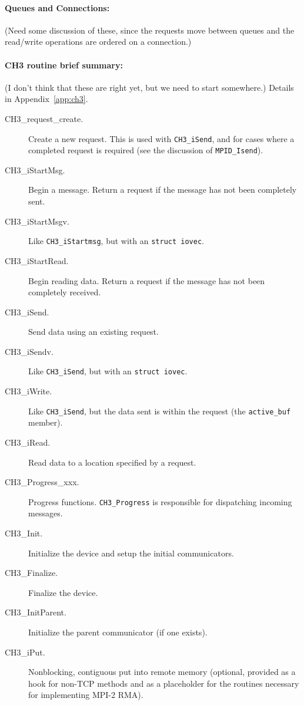 \documentclass{article}
\def\mpids#1#2{\code{#2}\index{#1!#2}}
\def\code{\begingroup\makeustext\eatcode}
\def\eatcode#1{\texttt{#1}\endgroup}
\begin{document}
\paragraph{Queues and Connections:}

(Need some discussion of these, since the requests move between queues and the 
read/write operations are ordered on a connection.)

\paragraph{CH3 routine brief summary:}

(I don't think that these are right yet, but we need to start somewhere.)
Details in Appendix~\ref{app:ch3}.

\begin{description}
\item[CH3\_request\_create.]Create a new request. This is used with
  \code{CH3_iSend}, and for cases where a completed request is required (see
  the discussion of \code{MPID_Isend}).
\item[CH3\_iStartMsg.]Begin a message.  Return a request if the message has not
  been completely sent.
\item[CH3\_iStartMsgv.]Like \code{CH3_iStartmsg}, but with an \code{struct
    iovec}.
\item[CH3\_iStartRead.]Begin reading data.  Return a request if the message has
  not been completely received.
\item[CH3\_iSend.]Send data using an existing request.
\item[CH3\_iSendv.]Like \code{CH3_iSend}, but with an \code{struct iovec}.
\item[CH3\_iWrite.]Like \code{CH3_iSend}, but the data sent is within the
  request (the \mpids{MPID_Request}{active\_buf} member).
\item[CH3\_iRead.]Read data to a location specified by a request.
\item[CH3\_Progress\_xxx.]Progress functions.  \code{CH3_Progress} is
  responsible for dispatching incoming messages.
\item[CH3\_Init.]Initialize the device and setup the initial communicators.
\item[CH3\_Finalize.]Finalize the device.
\item[CH3\_InitParent.]Initialize the parent communicator (if one exists).
\item[CH3\_iPut.]Nonblocking, contiguous put into remote memory (optional,
  provided as a hook for non-TCP methods and as a placeholder for the
  routines necessary for implementing MPI-2 RMA).
\end{description}
\end{document}

